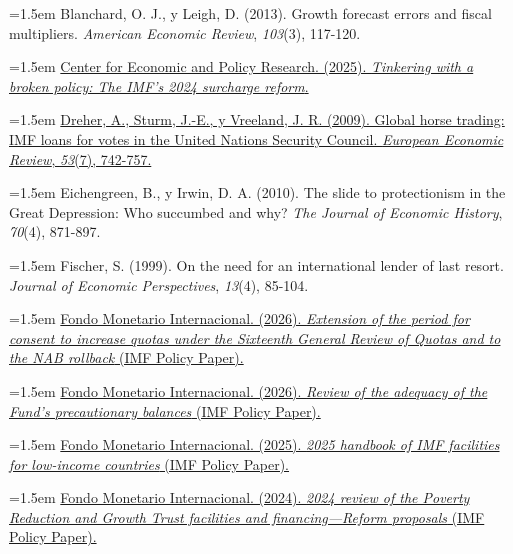 \documentclass[10pt,a4paper]{article}
\begin{document}
\noindent\hangindent=1.5em Blanchard, O. J., y Leigh, D. (2013). Growth forecast errors and fiscal multipliers. \textit{American Economic Review}, \textit{103}(3), 117-120.

\noindent\hangindent=1.5em \href{https://cepr.net/publications/tinkering-with-a-broken-policy-the-imfs-2024-surcharge-reform/}{Center for Economic and Policy Research. (2025). \textit{Tinkering with a broken policy: The IMF's 2024 surcharge reform}.}

\noindent\hangindent=1.5em \href{https://www.sciencedirect.com/science/article/abs/pii/S0014292109000312}{Dreher, A., Sturm, J.-E., y Vreeland, J. R. (2009). Global horse trading: IMF loans for votes in the United Nations Security Council. \textit{European Economic Review}, \textit{53}(7), 742-757.}

\noindent\hangindent=1.5em Eichengreen, B., y Irwin, D. A. (2010). The slide to protectionism in the Great Depression: Who succumbed and why? \textit{The Journal of Economic History}, \textit{70}(4), 871-897.

\noindent\hangindent=1.5em Fischer, S. (1999). On the need for an international lender of last resort. \textit{Journal of Economic Perspectives}, \textit{13}(4), 85-104.

\noindent\hangindent=1.5em \href{https://www.imf.org/en/publications/policy-papers/issues/2026/05/13/extension-of-the-period-for-consent-to-increase-quotas-under-the-sixteenth-general-review-576053}{Fondo Monetario Internacional. (2026). \textit{Extension of the period for consent to increase quotas under the Sixteenth General Review of Quotas and to the NAB rollback} (IMF Policy Paper).}

\noindent\hangindent=1.5em \href{https://www.imf.org/en/publications/policy-papers/issues/2026/04/09/review-of-the-adequacy-of-the-fund-s-precautionary-balances-575374}{Fondo Monetario Internacional. (2026). \textit{Review of the adequacy of the Fund's precautionary balances} (IMF Policy Paper).}

\noindent\hangindent=1.5em \href{https://www.imf.org/en/publications/policy-papers/issues/2025/04/23/2025-handbook-of-imf-facilities-for-low-income-countries-566429}{Fondo Monetario Internacional. (2025). \textit{2025 handbook of IMF facilities for low-income countries} (IMF Policy Paper).}

\noindent\hangindent=1.5em \href{https://www.imf.org/en/Publications/Policy-Papers/Issues/2024/10/21/2024-Review-Of-The-Poverty-Reduction-And-Growth-Trust-Facilities-And-Financing-Reform-556512}{Fondo Monetario Internacional. (2024). \textit{2024 review of the Poverty Reduction and Growth Trust facilities and financing---Reform proposals} (IMF Policy Paper).}
\end{document}
